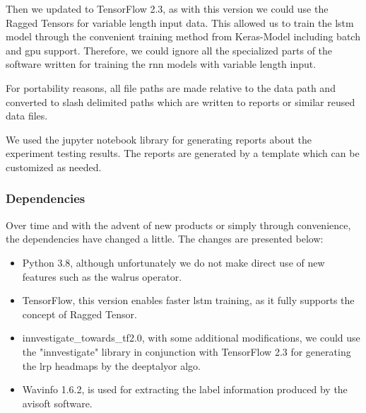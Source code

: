 Then we updated to TensorFlow 2.3, as with this version we could use the Ragged Tensors for variable length input data.
This allowed us to train the \gls{lstm} model through the convenient training method from Keras-Model including batch and \gls{gpu} support. Therefore, we could ignore all the specialized parts of the software written for training the \gls{rnn} models with variable length input.

For portability reasons, all file paths are made relative to the data path and converted to slash delimited paths which are written to reports or similar reused data files.

We used the jupyter notebook library for generating reports about the experiment testing results. The reports are generated by a template which can be customized as needed.

\subsubsection{Dependencies}
Over time and with the advent of new products or simply through convenience, the dependencies have changed a little.
The changes are presented below:
\begin{itemize}
    \item Python 3.8, although unfortunately we do not make direct use of new features such as the walrus operator.
    \item TensorFlow, this version enables faster \gls{lstm} training, as it fully supports the concept of Ragged Tensor.
    \item innvestigate\@updates\_towards\_tf2.0, with some additional modifications, we could use the "innvestigate" library in conjunction with TensorFlow 2.3 for generating the \gls{lrp} headmaps by the deeptalyor algo.
    \item Wavinfo 1.6.2, is used for extracting the label information produced by the avisoft software.
\end{itemize}

